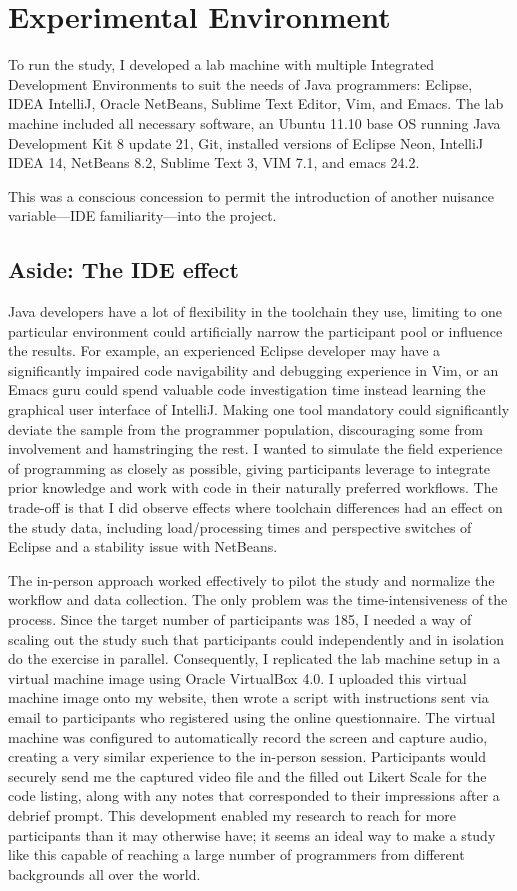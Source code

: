 \section{Experimental Environment}
To run the study, I developed a lab machine with multiple Integrated Development Environments to suit the needs of Java programmers: Eclipse, IDEA IntelliJ, Oracle NetBeans, Sublime Text Editor, Vim, and Emacs. The lab machine included all necessary software, an Ubuntu 11.10 base OS running Java Development Kit 8 update 21, Git, installed versions of Eclipse Neon, IntelliJ IDEA 14, NetBeans 8.2, Sublime Text 3, VIM 7.1, and emacs 24.2.

This was a conscious concession to permit the introduction of another nuisance variable—IDE familiarity—into the project.

\subsection{Aside: The IDE effect}
Java developers have a lot of flexibility in the toolchain they use, limiting to one particular environment could artificially narrow the participant pool or influence the results. For example, an experienced Eclipse developer may have a significantly impaired code navigability and debugging experience in Vim, or an Emacs guru could spend valuable code investigation time instead learning the graphical user interface of IntelliJ. Making one tool mandatory could significantly deviate the sample from the programmer population, discouraging some from involvement and hamstringing the rest. I wanted to simulate the field experience of programming as closely as possible, giving participants leverage to integrate prior knowledge and work with code in their naturally preferred workflows. The trade-off is that I did observe effects where toolchain differences had an effect on the study data, including load/processing times and perspective switches of Eclipse and a stability issue with NetBeans.

The in-person approach worked effectively to pilot the study and normalize the workflow and data collection. The only problem was the time-intensiveness of the process. Since the target number of participants was 185, I needed a way of scaling out the study such that participants could independently and in isolation do the exercise in parallel. Consequently, I replicated the lab machine setup in a virtual machine image using Oracle VirtualBox 4.0. I uploaded this virtual machine image onto my website, then wrote a script with instructions sent via email to participants who registered using the online questionnaire. The virtual machine was configured to automatically record the screen and capture audio, creating a very similar experience to the in-person session. Participants would securely send me the captured video file and the filled out Likert Scale for the code listing, along with any notes that corresponded to their impressions after a debrief prompt. This development enabled my research to reach for more participants than it may otherwise have; it seems an ideal way to make a study like this capable of reaching a large number of programmers from different backgrounds all over the world.

